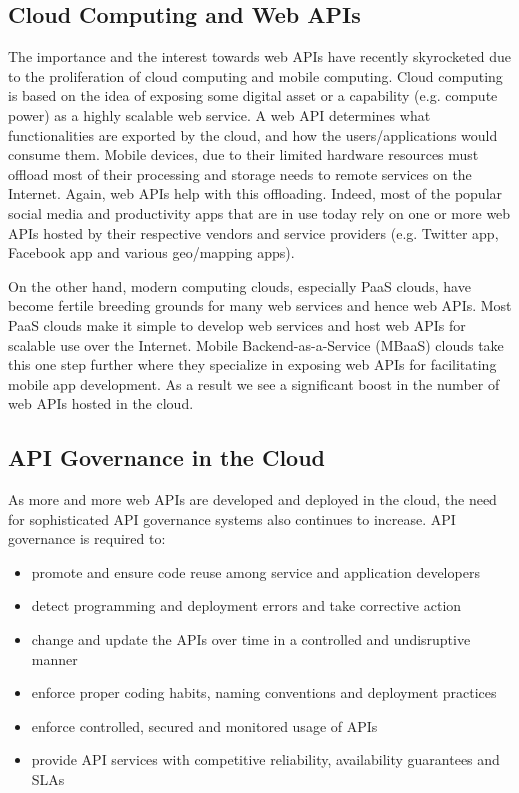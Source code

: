 \subsection{Cloud Computing and Web APIs}
The importance and the interest towards web APIs have recently skyrocketed due to the proliferation of cloud computing and mobile computing.
Cloud computing is based on the idea of exposing some digital asset or a capability (e.g. compute power) as a highly scalable web service. A 
web API determines
what functionalities are exported by the cloud, and how the users/applications would consume them. Mobile devices, due to their limited hardware
resources must offload most of their processing and storage needs to remote services on the Internet. Again, web APIs help with this offloading. 
Indeed, most of the popular social media and productivity apps
that are in use today rely on one or more web APIs hosted by their respective vendors and service providers (e.g. Twitter app, Facebook app and 
various geo/mapping apps).

On the other hand, modern computing clouds, especially PaaS clouds, have become fertile breeding grounds for many web services and hence 
web APIs. Most PaaS clouds make it simple to develop web services and host web APIs for scalable use over the Internet. Mobile 
Backend-as-a-Service (MBaaS) clouds take this one step further where they specialize in exposing web APIs for facilitating mobile
app development. As a result we see a significant boost in the number of web APIs hosted in the cloud.

\subsection{API Governance in the Cloud}
As more and more web APIs are developed and deployed in the cloud, the need for sophisticated API governance systems also continues to
increase. API governance is required to:

\begin{itemize}
\item promote and ensure code reuse among service and application developers
\item detect programming and deployment errors and take corrective action
\item change and update the APIs over time in a controlled and undisruptive manner
\item enforce proper coding habits, naming conventions and deployment practices
\item enforce controlled, secured and monitored usage of APIs
\item provide API services with competitive reliability, availability guarantees and SLAs
\end{itemize}

